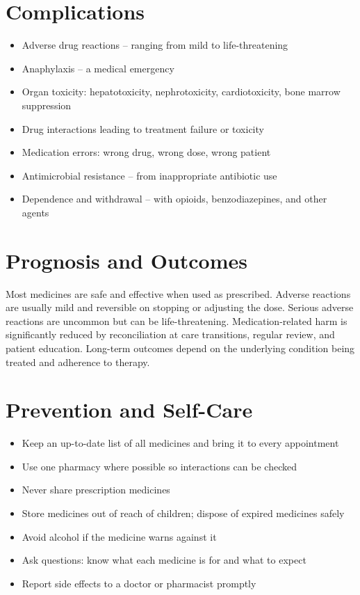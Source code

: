 \section*{Complications}
\begin{itemize}
    \item Adverse drug reactions -- ranging from mild to life-threatening
    \item Anaphylaxis -- a medical emergency
    \item Organ toxicity: hepatotoxicity, nephrotoxicity, cardiotoxicity, bone marrow suppression
    \item Drug interactions leading to treatment failure or toxicity
    \item Medication errors: wrong drug, wrong dose, wrong patient
    \item Antimicrobial resistance -- from inappropriate antibiotic use
    \item Dependence and withdrawal -- with opioids, benzodiazepines, and other agents
\end{itemize}

\section*{Prognosis and Outcomes}
Most medicines are safe and effective when used as prescribed. Adverse reactions are usually mild and reversible on stopping or adjusting the dose. Serious adverse reactions are uncommon but can be life-threatening. Medication-related harm is significantly reduced by reconciliation at care transitions, regular review, and patient education. Long-term outcomes depend on the underlying condition being treated and adherence to therapy.

\section*{Prevention and Self-Care}
\begin{itemize}
    \item Keep an up-to-date list of all medicines and bring it to every appointment
    \item Use one pharmacy where possible so interactions can be checked
    \item Never share prescription medicines
    \item Store medicines out of reach of children; dispose of expired medicines safely
    \item Avoid alcohol if the medicine warns against it
    \item Ask questions: know what each medicine is for and what to expect
    \item Report side effects to a doctor or pharmacist promptly
\end{itemize}
